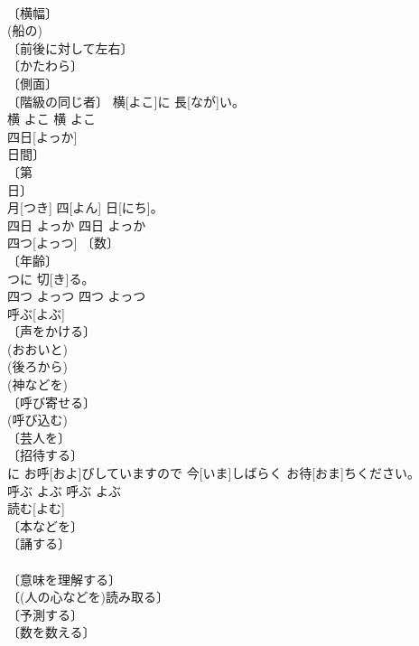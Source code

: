 \documentclass[8pt]{extreport}
\begin{document}
\begin{CJK}{UTF8}{min}
\\	〔横幅〕 
\\	(船の) 
\\	〔前後に対して左右〕 
\\	〔かたわら〕 
\\	〔側面〕 
\\	〔階級の同じ者〕	横[よこ]に 長[なが]い。	
\\	横	よこ	横	よこ	
\\	四日[よっか]	
\\	日間〕 
\\	〔第 
\\	日〕 
\\	月[つき] 四[よん] 日[にち]。	
\\	四日	よっか	四日	よっか	
\\	四つ[よっつ]	〔数〕 
\\	〔年齢〕 
\\	[＝よつ 
\\	四[よっ]つに 切[き]る。	
\\	四つ	よっつ	四つ	よっつ	
\\	呼ぶ[よぶ]	
\\	〔声をかける〕 
\\	(おおいと) 
\\	(後ろから) 
\\	(神などを) 
\\	〔呼び寄せる〕 
\\	(呼び込む) 
\\	〔芸人を〕 
\\	〔招待する〕 
\\	[⇒よばれる 
\\	〔引き起こす〕 
\\	〔引きつける〕 
\\	〔名づける〕 
\\	(学術上で) 
\\	〔悪名で〕 
\\	[⇒よばれる 
\\	順番[じゅんばん]に お呼[およ]びしていますので 今[いま]しばらく お待[おま]ちください。	
\\	呼ぶ	よぶ	呼ぶ	よぶ	
\\	読む[よむ]	
\\	〔本などを〕 
\\	〔誦する〕 
\\	[⇒よめる] 
\\	〔意味を理解する〕 
\\	〔(人の心などを)読み取る〕 
\\	〔予測する〕 
\\	〔数を数える〕 

\end{CJK}
\end{document}

